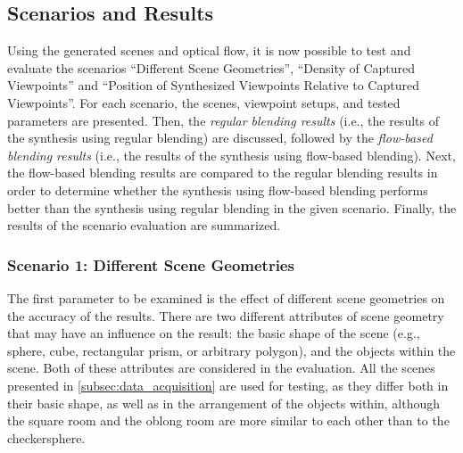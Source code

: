 \subsection{Scenarios and Results}\label{subsec:virt_results}
Using the generated scenes and optical flow, it is now possible to test and evaluate the scenarios ``Different Scene Geometries'', ``Density of Captured Viewpoints'' and ``Position of Synthesized Viewpoints Relative to Captured Viewpoints''. 
For each scenario, the scenes, viewpoint setups, and tested parameters are presented. Then, the \emph{regular blending results} (i.e., the results of the synthesis using regular blending) are discussed, followed by the \emph{flow-based blending results} (i.e., the results of the synthesis using flow-based blending). Next, the flow-based blending results are compared to the regular blending results in order to determine whether the synthesis using flow-based blending performs better than the synthesis using regular blending in the given scenario. Finally, the results of the scenario evaluation are summarized.

\subsubsection{Scenario 1: Different Scene Geometries}
The first parameter to be examined is the effect of different scene geometries on the accuracy of the results. There are two different attributes of scene geometry that may have an influence on the result: the basic shape of the scene (e.g., sphere, cube, rectangular prism, or arbitrary polygon), and the objects within the scene. Both of these attributes are considered in the evaluation. All the scenes presented in \ref{subsec:data_acquisition} are used for testing, as they differ both in their basic shape, as well as in the arrangement of the objects within, although the square room and the oblong room are more similar to each other than to the checkersphere.

